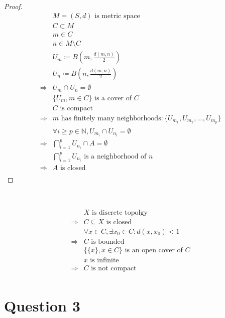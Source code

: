 \documentclass{article}
\begin{document}
~

\begin{proof}
    \begin{align*}
        &M=(S,d)\text{ is metric space}\\
        &C\subset M\\
        &m\in C\\
        &n\in M\setminus C\\
        &U_m\coloneqq B(m,\frac{d(m,n)}{2})\\
        &U_n\coloneqq B(n,\frac{d(m,n)}{2})\\
        \Rightarrow&U_m\cap U_n=\emptyset\\
        &\{U_m,m\in C\}\text{ is a cover of }C\\
        &C\text{ is compact}\\
        \Rightarrow&m\text{ has finitely many neighborhoods}:\{U_{m_1},U_{m_2},...,U_{m_p}\}\\
        &\forall i\geqslant p\in \mathbb{N} ,U_{m_i}\cap U_{n_i}=\emptyset\\
        \Rightarrow&\bigcap_{i=1}^{p}U_{n_i}\cap A=\emptyset\\
        &\bigcap_{i=1}^{p}U_{n_i}\text{ is a neighborhood of }n\\
        \Rightarrow&A\text{ is closed}\\
    \end{align*}
\end{proof}

~

\begin{align*}
    &X\text{ is discrete topolgy}\\
    \Rightarrow&C\subseteq X\text{ is closed}\\
    &\forall x\in C,\exists x_0\in C:d(x,x_0)<1\\
    \Rightarrow&C\text{ is bounded}\\
    &\{\{x\},x\in C\}\text{ is an open cover of }C\\
    &x\text{ is infinite}\\
    \Rightarrow&C\text{ is not compact}\\
\end{align*}

\newpage

\section*{Question 3}

~
\end{document}
